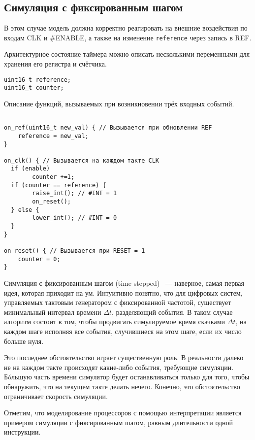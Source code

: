 \subsection{Симуляция с фиксированным шагом}

В этом случае модель должна корректно реагировать на внешние воздействия по входам CLK и \#ENABLE, а также на изменение \texttt{reference} через запись в REF.

Архитектурное состояние таймера можно описать несколькими переменными для хранения его регистра и счётчика.

\begin{lstlisting}
uint16_t reference;
uint16_t counter;
\end{lstlisting}

\todo Описание функций, вызываемых при возникновении трёх входных событий.

\begin{lstlisting}

on_ref(uint16_t new_val) { // Вызывается при обновлении REF
    reference = new_val;
}

on_clk() { // Вызывается на каждом такте CLK
  if (enable)
        counter +=1;
  if (counter == reference) {
        raise_int(); // #INT = 1
        on_reset();
  } else {
        lower_int(); // #INT = 0
  }
}

on_reset() { // Вызывается при RESET = 1
    counter = 0;
}
\end{lstlisting}

Симуляция с фиксированным шагом (\abbr time stepped)~\cite{ferscha-1995-pdes} --- наверное, самая первая идея, которая приходит на ум. Интуитивно понятно, что для цифровых систем, управляемых тактовым генератором с фиксированной частотой, существует минимальный интервал времени $\Delta t$, разделяющий события. В таком случае алгоритм состоит в том, чтобы продвигать симулируемое время скачками $\Delta t$, на каждом шаге исполняя все события, случившиеся на этом шаге, если их число больше нуля.

Это последнее обстоятельство играет существенную роль. В реальности далеко не на каждом такте происходят какие-либо события, требующие симуляции. Бóльшую часть времени симулятор будет останавливаться только для того, чтобы обнаружить, что на текущем такте делать нечего. Конечно, это обстоятельство ограничивает скорость симуляции.

Отметим, что моделирование процессоров с помощью интерпретации является примером симуляции с фиксированным шагом, равным длительности одной инструкции.

